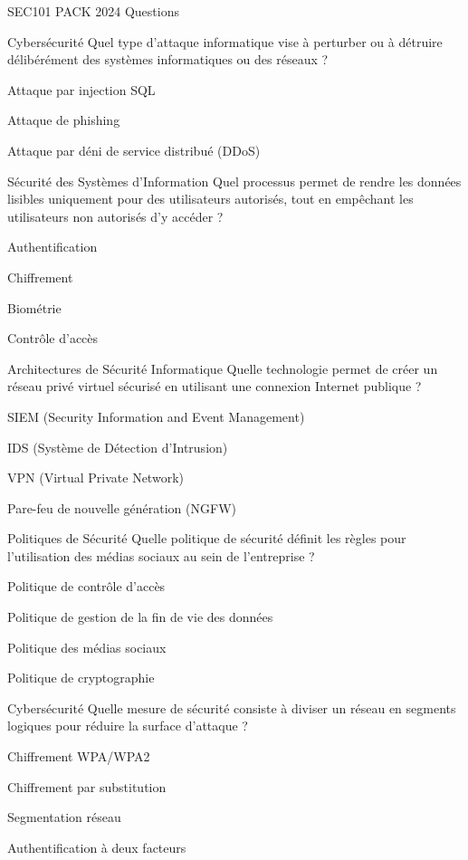 \documentclass[12pt]{article}
\begin{document}
\begin{quiz}{SEC101 PACK 2024 Questions}
  \begin{multi}[points=1]{Cybersécurité}
    Quel type d'attaque informatique vise à perturber ou à détruire délibérément des systèmes informatiques ou des réseaux ?
    \item Attaque par injection SQL
    \item Attaque de phishing
    \item* Attaque par déni de service distribué (DDoS)
  \end{multi}

  \begin{multi}[points=1]{Sécurité des Systèmes d'Information}
    Quel processus permet de rendre les données lisibles uniquement pour des utilisateurs autorisés, tout en empêchant les utilisateurs non autorisés d'y accéder ?
    \item Authentification
    \item Chiffrement
    \item Biométrie
    \item* Contrôle d'accès
  \end{multi}

  \begin{multi}[points=1]{Architectures de Sécurité Informatique}
    Quelle technologie permet de créer un réseau privé virtuel sécurisé en utilisant une connexion Internet publique ?
    \item SIEM (Security Information and Event Management)
    \item IDS (Système de Détection d'Intrusion)
    \item* VPN (Virtual Private Network)
    \item Pare-feu de nouvelle génération (NGFW)
  \end{multi}

  \begin{multi}[points=1]{Politiques de Sécurité}
    Quelle politique de sécurité définit les règles pour l'utilisation des médias sociaux au sein de l'entreprise ?
    \item Politique de contrôle d'accès
    \item Politique de gestion de la fin de vie des données
    \item* Politique des médias sociaux
    \item Politique de cryptographie
  \end{multi}

  \begin{multi}[points=1]{Cybersécurité}
    Quelle mesure de sécurité consiste à diviser un réseau en segments logiques pour réduire la surface d'attaque ?
    \item Chiffrement WPA/WPA2
    \item Chiffrement par substitution
    \item* Segmentation réseau
    \item Authentification à deux facteurs
  \end{multi}


\end{quiz}
\end{document}
